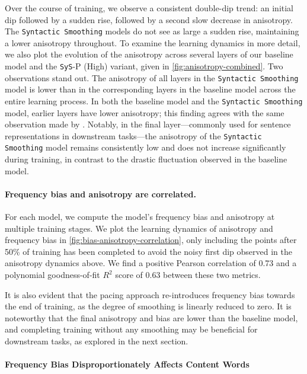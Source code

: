 Over the course of training, we observe a consistent double-dip trend: an initial dip followed by a sudden rise, followed by a second slow decrease in anisotropy. The \texttt{Syntactic Smoothing} models do not see as large a sudden rise, maintaining a lower anisotropy throughout. To examine the learning dynamics in more detail, we also plot the evolution of the anisotropy across several layers of our baseline model and the \texttt{SyS}-P (High) variant, given in \cref{fig:anisotropy-combined}. Two observations stand out. The anisotropy of all layers in the \texttt{Syntactic Smoothing} model is lower than in the corresponding layers in the baseline model across the entire learning process. In both the baseline model and the \texttt{Syntactic Smoothing} model, earlier layers have lower anisotropy; this finding agrees with the same observation made by \citeauthor{ethayarajh2019contextual}. Notably, in the final layer—commonly used for sentence representations in downstream tasks—the anisotropy of the \texttt{Syntactic Smoothing} model remains consistently low and does not increase significantly during training, in contrast to the drastic fluctuation observed in the baseline model. 



\paragraph{Frequency bias and anisotropy are correlated.}

For each model, we compute the model's frequency bias and anisotropy at multiple training stages. We plot the learning dynamics of anisotropy and frequency bias in \cref{fig:bias-anisotropy-correlation}, only including the points after 50\% of training has been completed to avoid the noisy first dip observed in the anisotropy dynamics above. We find a positive Pearson correlation of 0.73 and a polynomial goodness-of-fit $R^2$ score of 0.63 between these two metrics.

It is also evident that the pacing approach re-introduces frequency bias towards the end of training, as the degree of smoothing is linearly reduced to zero. It is noteworthy that the final anisotropy and bias are lower than the baseline model, and completing training without any smoothing may be beneficial for downstream tasks, as explored in the next section.

\paragraph{Frequency Bias Disproportionately Affects Content Words}
\label{section:word-class-versus-word-frequency}


